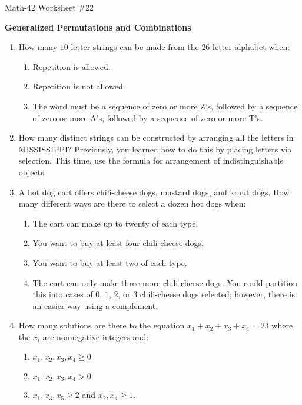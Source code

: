 \documentclass[letterpaper,12pt,fleqn]{article}
\begin{document}
\begin{center}
  \large Math-42 Worksheet \#22

  \textbf{Generalized Permutations and Combinations}
\end{center}

\vspace{0.5in}

\begin{enumerate}[left=0in,itemsep=0.5in]
\item How many \(10\)-letter strings can be made from the \(26\)-letter alphabet when:
  \begin{enumerate}
  \item Repetition is allowed.
  \item Repetition is not allowed.
  \item The word must be a sequence of zero or more Z's, followed by a sequence of zero or more A's, followed by
    a sequence of zero or more T's.
  \end{enumerate}

\item How many distinct strings can be constructed by arranging all the letters in MISSISSIPPI?  Previously, you
  learned how to do this by placing letters via selection.  This time, use the formula for arrangement of
  indistinguishable objects.

\item A hot dog cart offers chili-cheese dogs, mustard dogs, and kraut dogs.  How many different ways are there to
  select a dozen hot dogs when:
  \begin{enumerate}
  \item The cart can make up to twenty of each type.
  \item You want to buy at least four chili-cheese dogs.
  \item You want to buy at least two of each type.
  \item The cart can only make three more chili-cheese dogs. You could partition this into cases of \(0\), \(1\),
    \(2\), or \(3\) chili-cheese dogs selected; however, there is an easier way using a complement.
  \end{enumerate}

\item How many solutions are there to the equation \(x_1+x_2+x_3+x_4=23\) where the \(x_i\) are nonnegative
  integers and:
  \begin{enumerate}
  \item \(x_1,x_2,x_3,x_4\ge0\)
  \item \(x_1,x_2,x_3,x_4>0\)
  \item \(x_1,x_3,x_5\ge2\) and \(x_2,x_4\ge1\).
  \end{enumerate}


\end{enumerate}
\end{document}
